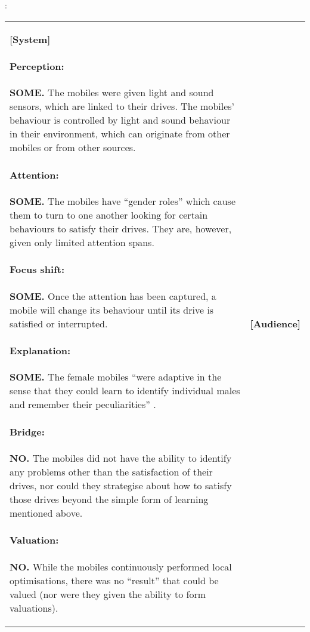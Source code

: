 \begin{table}
\begin{mdframed}
: 
\begin{tabular}{@{\hspace{-0.01\textwidth}}p{}@{\hspace{.02\textwidth}}p{}}
\begin{minipage}{.48\textwidth}
\textbf{[System]}
\paragraph{Perception:} \textbf{SOME.}
The mobiles were given light and sound sensors, which are linked to their drives.
The mobiles' behaviour is controlled by light and sound behaviour in their
environment, which can originate from other mobiles or from other sources.
\paragraph{Attention:} \textbf{SOME.}
The mobiles have ``gender roles'' which cause them to turn to one another
looking for certain behaviours to satisfy their drives.  They are, however,
given only limited attention spans.
\paragraph{Focus shift:} \textbf{SOME.} Once the attention
has been captured, a mobile will change its behaviour until its drive
is satisfied or interrupted.
\paragraph{Explanation:}
\textbf{SOME.}  The female mobiles ``were adaptive in the sense that
they could learn to identify individual males and remember their
peculiarities''  \cite{pickering2007ontological}.
\paragraph{Bridge:} \textbf{NO.} The mobiles did not have
the ability to identify any problems other than the satisfaction of
their drives, nor could they strategise about how to satisfy those
drives beyond the simple form of learning mentioned above.
\paragraph{Valuation:} \textbf{NO.} While the mobiles continuously performed
local optimisations, there was no ``result'' that could be valued (nor were
they given the ability to form valuations).
\end{minipage} &
\begin{minipage}{.48\textwidth}
\textbf{[Audience]}

\end{minipage}
\end{tabular}
\end{mdframed}
\end{table}
